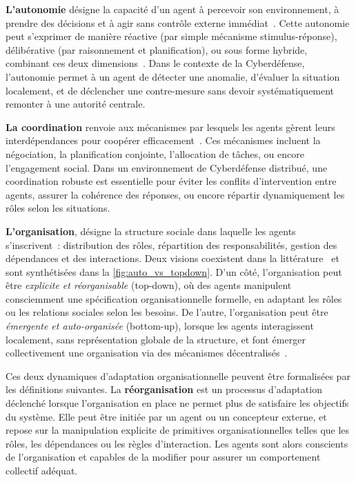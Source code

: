 \textbf{L'autonomie} désigne la capacité d'un agent à percevoir son environnement, à prendre des décisions et à agir sans contrôle externe immédiat~\cite{Russell2010}. Cette autonomie peut s'exprimer de manière réactive (par simple mécanisme stimulus-réponse), délibérative (par raisonnement et planification), ou sous forme hybride, combinant ces deux dimensions~\cite{Georgeff1987}. Dans le contexte de la Cyberdéfense, l'autonomie permet à un agent de détecter une anomalie, d'évaluer la situation localement, et de déclencher une contre-mesure sans devoir systématiquement remonter à une autorité centrale.

\textbf{La coordination} renvoie aux mécanismes par lesquels les agents gèrent leurs interdépendances pour coopérer efficacement~\cite{Durfee2001, Jennings1996, Sandholm1999}. Ces mécanismes incluent la négociation, la planification conjointe, l'allocation de tâches, ou encore l'engagement social. Dans un environnement de Cyberdéfense distribué, une coordination robuste est essentielle pour éviter les conflits d'intervention entre agents, assurer la cohérence des réponses, ou encore répartir dynamiquement les rôles selon les situations.

\textbf{L'organisation}, désigne la structure sociale dans laquelle les agents s'inscrivent~: distribution des rôles, répartition des responsabilités, gestion des dépendances et des interactions. Deux visions coexistent dans la littérature~\cite{Picard2009reorganisation} et sont synthétisées dans la \autoref{fig:auto_vs_topdown}. D'un côté, l'organisation peut être \emph{explicite et réorganisable} (top-down), où des agents manipulent consciemment une spécification organisationnelle formelle, en adaptant les rôles ou les relations sociales selon les besoins. De l'autre, l'organisation peut être \emph{émergente et auto-organisée} (bottom-up), lorsque les agents interagissent localement, sans représentation globale de la structure, et font émerger collectivement une organisation via des mécanismes décentralisés~\cite{Heylighen1999, DiMarzoSerugendo2006}.

Ces deux dynamiques d'adaptation organisationnelle peuvent être formalisées par les définitions suivantes. La \textbf{réorganisation} est un processus d'adaptation déclenché lorsque l'organisation en place ne permet plus de satisfaire les objectifs du système. Elle peut être initiée par un agent ou un concepteur externe, et repose sur la manipulation explicite de primitives organisationnelles telles que les rôles, les dépendances ou les règles d'interaction. Les agents sont alors conscients de l'organisation et capables de la modifier pour assurer un comportement collectif adéquat.

